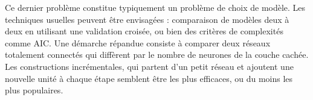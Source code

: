 Ce dernier probl\`eme constitue typiquement un probl\`eme de choix
de mod\`ele. Les techniques usuelles peuvent \^etre envisag\'ees : 
comparaison de mod\`eles deux \`a deux en utilisant 
une validation crois\'ee, ou bien des crit\`eres de complexit\'es comme
AIC. Une d\'emarche r\'epandue consiste \`a comparer deux r\'eseaux 
totalement connect\'es qui diff\`erent par le nombre de neurones de la couche
cach\'ee.  Les constructions incr\'ementales, qui partent d'un
petit r\'eseau et ajoutent une nouvelle unit\'e \`a chaque \'etape semblent \^etre
les plus efficaces, ou du moins les plus populaires.

















